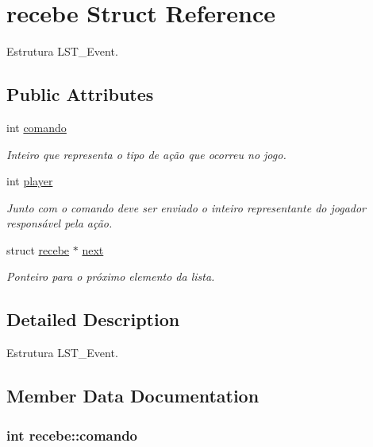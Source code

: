 \hypertarget{structrecebe}{\section{recebe Struct Reference}
\label{structrecebe}
}


Estrutura L\+S\+T\+\_\+\+Event.  


\subsection*{Public Attributes}
\begin{DoxyCompactItemize}
\item 
int \hyperlink{structrecebe_a8d29126b1902f0e8206fb54d7b73cf55}{comando}
\begin{DoxyCompactList}\small\item\em Inteiro que representa o tipo de ação que ocorreu no jogo. \end{DoxyCompactList}\item 
int \hyperlink{structrecebe_aa3c608135add531f3120b2460e09bff2}{player}
\begin{DoxyCompactList}\small\item\em Junto com o comando deve ser enviado o inteiro representante do jogador responsável pela ação. \end{DoxyCompactList}\item 
struct \hyperlink{structrecebe}{recebe} $\ast$ \hyperlink{structrecebe_afd17b6474940eb351c1635212f426597}{next}
\begin{DoxyCompactList}\small\item\em Ponteiro para o próximo elemento da lista. \end{DoxyCompactList}\end{DoxyCompactItemize}


\subsection{Detailed Description}
Estrutura L\+S\+T\+\_\+\+Event. 



\subsection{Member Data Documentation}
\hypertarget{structrecebe_a8d29126b1902f0e8206fb54d7b73cf55}{
\subsubsection[{comando}]{\setlength{\rightskip}{0pt plus 5cm}int recebe\+::comando}}\label{structrecebe_a8d29126b1902f0e8206fb54d7b73cf55}


